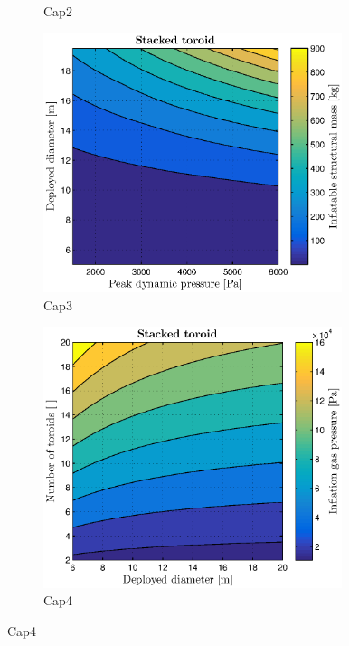 \begin{figure}[h]
\begin{subfigure}[b]{0.49\textwidth}
		\caption{Cap2}
		\label{fig:halfcone}
	\end{subfigure}
	\begin{subfigure}[b]{0.49\textwidth}
		\includegraphics[width=0.96\textwidth]{./Figure/Structure/pressure_test.eps}
		\caption{Cap3}
		\label{fig:pressure}
	\end{subfigure}
	\begin{subfigure}[b]{0.49\textwidth}
		\includegraphics[width=0.96\textwidth]{./Figure/Structure/inflation_test.eps}
		\caption{Cap4}
		\label{fig:inlfation}
	\end{subfigure}
\end{figure}
